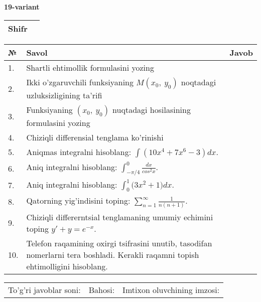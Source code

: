 \documentclass{article}
\begin{document}
  \egroup
  
  \newpage
  
  
  \textbf{19-variant}\\
  
  \bgroup
  \def\arraystretch{1.6} %
  
  \begin{tabular}{|m{5.7cm}|m{9.5cm}|}
  \hline
  Shifr & \\
  \hline
  \end{tabular}
  
  \vspace{1cm}
  
  \begin{tabular}{|m{0.7cm}|m{10cm}|m{4cm}|}
  \hline
  № & Savol & Javob \\
  \hline
  1. & Shartli ehtimollik formulasini yozing &  \\
  \hline
  2. & Ikki o'zgaruvchili funksiyaning \(M(x_{0},\ y_{0})\) noqtadagi uzluksizligining ta'rifi &  \\
  \hline
  3. & Funksiyaning \((x_{0},\ y_{0})\) nuqtadagi hosilasining formulasini yozing &  \\
  \hline
  4. & Chiziqli differensial tenglama ko'rinishi &  \\
  \hline
  5. & Aniqmas integralni hisoblang: \(\int {\left( 10x^{4} + 7x^{6} - 3 \right)dx}\). &  \\
  \hline
  6. & Aniq integralni hisoblang: \(\int_{- \pi/4}^{0}\frac{dx}{cos^{2}x}\). &  \\
  \hline
  7. & Aniq integralni hisoblang: \(\int_{0}^{1}{(3x^{2}} + 1)dx\). &  \\
  \hline
  8. & Qatorning yig'indisini toping: \(\sum_{n = 1}^{\infty}\frac{1}{n(n + 1)}\). &  \\
  \hline
  9. & Chiziqli differerntsial tenglamaning umumiy echimini toping \(y' + y = e^{- x}\). &  \\
  \hline
  10. & Telefon raqamining oxirgi tsifrasini unutib, tasodifan nomerlarni tera boshladi. Kerakli raqamni topish ehtimolligini hisoblang. &  \\
  \hline
  \end{tabular}
  
  \vspace{1cm}
  
  \begin{tabular}{lll}
  To'g'ri javoblar soni: \underline{\hspace{1.5cm}} & 
  Bahosi: \underline{\hspace{1.5cm}} & 
  Imtixon oluvchining imzosi: \underline{\hspace{2cm}} \\
  \end{tabular}
  
\end{document}
